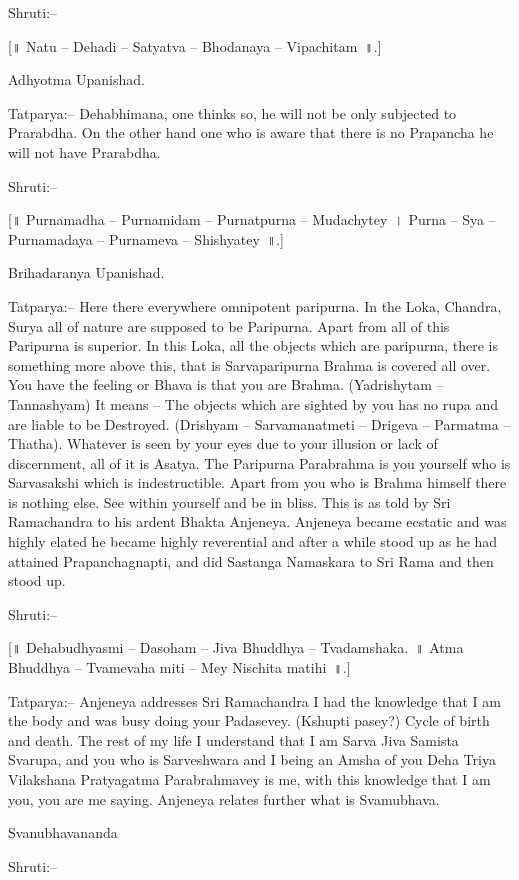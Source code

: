 Shruti:–

[॥ Natu – Dehadi – Satyatva – Bhodanaya – Vipachitam~॥.]

Adhyotma Upanishad.

Tatparya:– Dehabhimana, one thinks so, he will not be only subjected to Prarabdha. On the other hand one who is aware that there is no Prapancha he will not have Prarabdha.

Shruti:–

[॥ Purnamadha – Purnamidam – Purnatpurna – Mudachytey~। Purna – Sya – Purnamadaya – Purnameva – Shishyatey~॥.]

Brihadaranya Upanishad.

Tatparya:– Here there everywhere omnipotent paripurna. In the Loka, Chandra, Surya all of nature are supposed to be Paripurna. Apart from all of this Paripurna is superior. In this Loka, all the objects which are paripurna, there is something more above this, that is Sarvaparipurna Brahma is covered all over. You have the feeling or Bhava is that you are Brahma. (Yadrishytam – Tannashyam) It means – The objects which are sighted by you has no rupa and are liable to be Destroyed. (Drishyam – Sarvamanatmeti – Drigeva – Parmatma – Thatha). Whatever is seen by your eyes due to your illusion or lack of discernment, all of it is Asatya. The Paripurna Parabrahma is you yourself who is Sarvasakshi which is indestructible. Apart from you who is Brahma himself there is nothing else. See within yourself and be in bliss. This is as told by Sri Ramachandra to his ardent Bhakta Anjeneya. Anjeneya became ecstatic and was highly elated he became highly reverential and after a while stood up as he had attained Prapanchagnapti, and did Sastanga Namaskara to Sri Rama and then stood up.

Shruti:–

[॥ Dehabudhyasmi – Dasoham – Jiva Bhuddhya – Tvadamshaka.~॥ Atma Bhuddhya – Tvamevaha miti – Mey Nischita matihi~॥.]

Tatparya:– Anjeneya addresses Sri Ramachandra I had the knowledge that I am the body and was busy doing your Padasevey. (Kshupti pasey?) Cycle of birth and death. The rest of my life I understand that I am Sarva Jiva Samista Svarupa, and you who is Sarveshwara and I being an Amsha of you Deha Triya Vilakshana Pratyagatma Parabrahmavey is me, with this knowledge that I am you, you are me saying. Anjeneya relates further what is Svamubhava.

Svanubhavananda

Shruti:–

